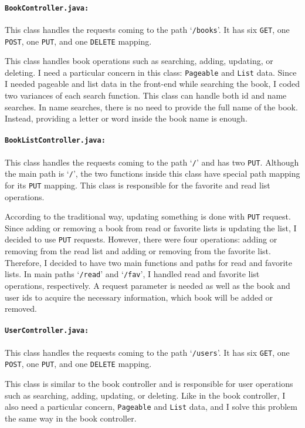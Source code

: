 \paragraph{\texttt{BookController.java:}} This class handles the requests coming to the path `\texttt{/books}'. It has six \texttt{GET}, one \texttt{POST}, one \texttt{PUT}, and one \texttt{DELETE} mapping. 

This class handles book operations such as searching, adding, updating, or deleting. I need a particular concern in this class: \texttt{Pageable} and \texttt{List} data. Since I needed pageable and list data in the front-end while searching the book, I coded two variances of each search function. This class can handle both id and name searches. In name searches, there is no need to provide the full name of the book. Instead, providing a letter or word inside the book name is enough.

\paragraph{\texttt{BookListController.java:}} This class handles the requests coming to the path `\texttt{/}' and has two \texttt{PUT}. Although the main path is `\texttt{/}', the two functions inside this class have special path mapping for its \texttt{PUT} mapping. This class is responsible for the favorite and read list operations. 

According to the traditional way, updating something is done with \texttt{PUT} request. Since adding or removing a book from read or favorite lists is updating the list, I decided to use \texttt{PUT} requests. However, there were four operations: adding or removing from the read list and adding or removing from the favorite list. Therefore, I decided to have two main functions and paths for read and favorite lists. In main paths `\texttt{/read}' and `\texttt{/fav}', I handled read and favorite list operations, respectively. A request parameter is needed as well as the book and user ids to acquire the necessary information, which book will be added or removed.

\paragraph{\texttt{UserController.java:}} This class handles the requests coming to the path `\texttt{/users}'. It has six \texttt{GET}, one \texttt{POST}, one \texttt{PUT}, and one \texttt{DELETE} mapping.

This class is similar to the book controller and is responsible for user operations such as searching, adding, updating, or deleting. Like in the book controller, I also need a particular concern, \texttt{Pageable} and \texttt{List} data, and I solve this problem the same way in the book controller.


